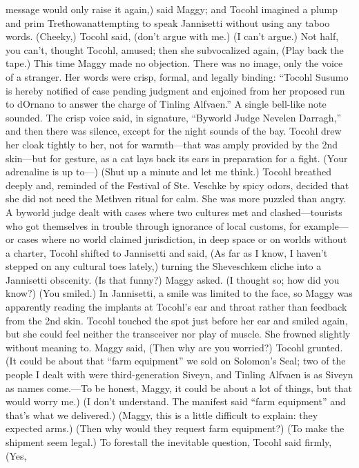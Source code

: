 \documentclass[9pt]{article}
\begin{document}
message would only raise it again,) said Maggy; and Tocohl imagined a plump and prim Trethowanattempting to speak Jannisetti without using any taboo words.
(Cheeky,) Tocohl said, (don’t argue with me.)
(I can’t argue.)
Not half, you can’t, thought Tocohl, amused; then she subvocalized again, (Play back the tape.)
This time Maggy made no objection.
There was no image, only the voice of a stranger. Her words were crisp, formal, and legally binding:
“Tocohl Susumo is hereby notified of case pending judgment and enjoined from her proposed run to
dOrnano to answer the charge of Tinling Alfvaen.” A single bell-like note sounded. The crisp voice said,
in signature, “Byworld Judge Nevelen Darragh,” and then there was silence, except for the night sounds
of the bay.
Tocohl drew her cloak tightly to her, not for warmth—that was amply provided by the 2nd skin—but
for gesture, as a cat lays back its ears in preparation for a fight.
(Your adrenaline is up to—)
(Shut up a minute and let me think.) Tocohl breathed deeply and, reminded of the Festival of Ste.
Veschke by spicy odors, decided that she did not need the Methven ritual for calm.
She was more puzzled than angry. A byworld judge dealt with cases where two cultures met and
clashed—tourists who got themselves in trouble through ignorance of local customs, for example—or
cases where no world claimed jurisdiction, in deep space or on worlds without a charter,
Tocohl shifted to Jannisetti and said, (As far as I know, I haven’t stepped on any cultural toes lately,)
turning the Sheveschkem cliche into a Jannisetti obscenity.
(Is that funny?) Maggy asked.
(I thought so; how did you know?)
(You smiled.)
In Jannisetti, a smile was limited to the face, so Maggy was apparently reading the implants at
Tocohl’s ear and throat rather than feedback from the 2nd skin. Tocohl touched the spot just before her
ear and smiled again, but she could feel neither the transceiver nor play of muscle. She frowned slightly
without meaning to.
Maggy said, (Then why are you worried?)
Tocohl grunted. (It could be about that “farm equipment” we sold on Solomon’s Seal; two of the
people I dealt with were third-generation Siveyn, and Tinling Alfvaen is as Siveyn as names come.—To
be honest, Maggy, it could be about a lot of things, but that would worry me.)
(I don’t understand. The manifest said “farm equipment” and that’s what we delivered.)
(Maggy, this is a little difficult to explain: they expected arms.)
(Then why would they request farm equipment?)
(To make the shipment seem legal.) To forestall the inevitable question, Tocohl said firmly, (Yes,
\end{document}
